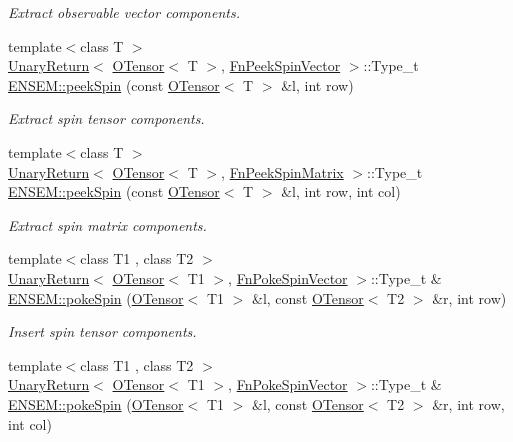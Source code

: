 \begin{DoxyCompactItemize}
\begin{DoxyCompactList}\small\item\em Extract observable vector components. \end{DoxyCompactList}\item 
{\footnotesize template$<$class T $>$ }\\\mbox{\hyperlink{structENSEM_1_1UnaryReturn}{Unary\+Return}}$<$ \mbox{\hyperlink{classENSEM_1_1OTensor}{O\+Tensor}}$<$ T $>$, \mbox{\hyperlink{structENSEM_1_1FnPeekSpinVector}{Fn\+Peek\+Spin\+Vector}} $>$\+::Type\+\_\+t \mbox{\hyperlink{group__obstensor_gaeee51a2a721122db062ffe8a3e0192c3}{E\+N\+S\+E\+M\+::peek\+Spin}} (const \mbox{\hyperlink{classENSEM_1_1OTensor}{O\+Tensor}}$<$ T $>$ \&l, int row)
\begin{DoxyCompactList}\small\item\em Extract spin tensor components. \end{DoxyCompactList}\item 
{\footnotesize template$<$class T $>$ }\\\mbox{\hyperlink{structENSEM_1_1UnaryReturn}{Unary\+Return}}$<$ \mbox{\hyperlink{classENSEM_1_1OTensor}{O\+Tensor}}$<$ T $>$, \mbox{\hyperlink{structENSEM_1_1FnPeekSpinMatrix}{Fn\+Peek\+Spin\+Matrix}} $>$\+::Type\+\_\+t \mbox{\hyperlink{group__obstensor_ga7cb1fd7617714b490522aee26dd999be}{E\+N\+S\+E\+M\+::peek\+Spin}} (const \mbox{\hyperlink{classENSEM_1_1OTensor}{O\+Tensor}}$<$ T $>$ \&l, int row, int col)
\begin{DoxyCompactList}\small\item\em Extract spin matrix components. \end{DoxyCompactList}\item 
{\footnotesize template$<$class T1 , class T2 $>$ }\\\mbox{\hyperlink{structENSEM_1_1UnaryReturn}{Unary\+Return}}$<$ \mbox{\hyperlink{classENSEM_1_1OTensor}{O\+Tensor}}$<$ T1 $>$, \mbox{\hyperlink{structENSEM_1_1FnPokeSpinVector}{Fn\+Poke\+Spin\+Vector}} $>$\+::Type\+\_\+t \& \mbox{\hyperlink{group__obstensor_ga8cc48d37eeb15654e69ed5549844c124}{E\+N\+S\+E\+M\+::poke\+Spin}} (\mbox{\hyperlink{classENSEM_1_1OTensor}{O\+Tensor}}$<$ T1 $>$ \&l, const \mbox{\hyperlink{classENSEM_1_1OTensor}{O\+Tensor}}$<$ T2 $>$ \&r, int row)
\begin{DoxyCompactList}\small\item\em Insert spin tensor components. \end{DoxyCompactList}\item 
{\footnotesize template$<$class T1 , class T2 $>$ }\\\mbox{\hyperlink{structENSEM_1_1UnaryReturn}{Unary\+Return}}$<$ \mbox{\hyperlink{classENSEM_1_1OTensor}{O\+Tensor}}$<$ T1 $>$, \mbox{\hyperlink{structENSEM_1_1FnPokeSpinVector}{Fn\+Poke\+Spin\+Vector}} $>$\+::Type\+\_\+t \& \mbox{\hyperlink{group__obstensor_ga2d8623a3d55d368dba3e7b2e1418b6a1}{E\+N\+S\+E\+M\+::poke\+Spin}} (\mbox{\hyperlink{classENSEM_1_1OTensor}{O\+Tensor}}$<$ T1 $>$ \&l, const \mbox{\hyperlink{classENSEM_1_1OTensor}{O\+Tensor}}$<$ T2 $>$ \&r, int row, int col)

\end{DoxyCompactItemize}
